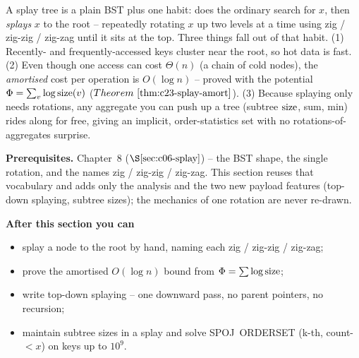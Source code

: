 \begin{topicintro}
A splay tree is a plain BST plus one habit:  does the ordinary
search for \(x\), then \emph{splays} \(x\) to the root -- repeatedly rotating \(x\)
up two levels at a time using zig / zig-zig / zig-zag until it sits at the top.
Three things fall out of that habit. (1) Recently- and frequently-accessed keys
cluster near the root, so hot data is fast. (2) Even though one access can cost
\(\Theta(n)\) (a chain of cold nodes), the \emph{amortised} cost per operation is
\(O(\log n)\) -- proved with the potential \(\Phi=\sum_v \log \operatorname{size}(v)\)
(\(\thmref{c23-splay-amort}\)). (3) Because splaying only needs rotations, any
aggregate you can push up a tree (subtree \(\operatorname{size}\), sum, min) rides along for
free, giving an implicit, order-statistics set with no rotations-of-aggregates
surprise.

\textbf{Prerequisites.} Chapter~8 (\(\secref{c06-splay}\)) -- the BST shape, the
single rotation, and the names zig / zig-zig / zig-zag. This section reuses that
vocabulary and adds only the analysis and the two new payload features (top-down
splaying, subtree sizes); the mechanics of one rotation are never re-drawn.

\textbf{After this section you can}
\begin{itemize}[nosep]
  \item splay a node to the root by hand, naming each zig / zig-zig / zig-zag; \hfill{}
  \item prove the amortised \(O(\log n)\) bound from \(\Phi=\sum\log\operatorname{size}\); \hfill{}
  \item write top-down splaying -- one downward pass, no parent pointers, no recursion; \hfill{}
  \item maintain subtree sizes in a splay and solve SPOJ~ORDERSET (k-th, count-\(<x\))
        on keys up to \(10^9\). \hfill{}
\end{itemize}
\end{topicintro}

